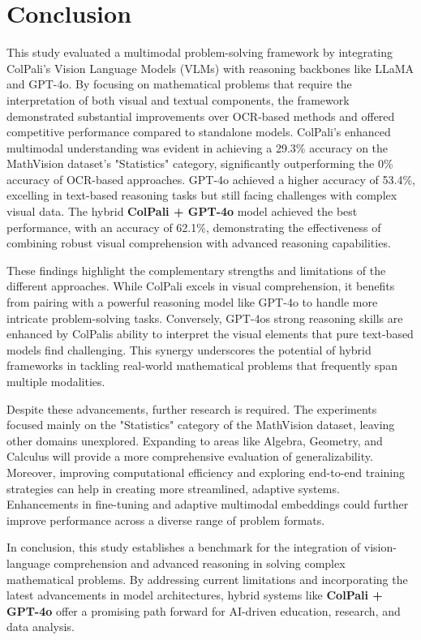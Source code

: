 \documentclass[a4paper,twoside,flushend, 10pt]{article}
\begin{document}
\section{Conclusion}
\noindent
This study evaluated a multimodal problem-solving framework by integrating ColPali's Vision Language Models (VLMs) with reasoning backbones like LLaMA and GPT-4o. By focusing on mathematical problems that require the interpretation of both visual and textual components, the framework demonstrated substantial improvements over OCR-based methods and offered competitive performance compared to standalone models. ColPali's enhanced multimodal understanding was evident in achieving a 29.3\% accuracy on the MathVision dataset's "Statistics" category, significantly outperforming the 0\% accuracy of OCR-based approaches\cite{WPS2024}. GPT-4o achieved a higher accuracy of 53.4\%, excelling in text-based reasoning tasks but still facing challenges with complex visual data. The hybrid \textbf{ColPali + GPT-4o} model achieved the best performance, with an accuracy of 62.1\%, demonstrating the effectiveness of combining robust visual comprehension with advanced reasoning capabilities\cite{FSW2024}. 

These findings highlight the complementary strengths and limitations of the different approaches. While ColPali excels in visual comprehension, it benefits from pairing with a powerful reasoning model like GPT-4o to handle more intricate problem-solving tasks. Conversely, GPT-4o\textquotesingle s strong reasoning skills are enhanced by ColPali\textquotesingle s ability to interpret the visual elements that pure text-based models find challenging. This synergy underscores the potential of hybrid frameworks in tackling real-world mathematical problems that frequently span multiple modalities.

Despite these advancements, further research is required. The experiments focused mainly on the "Statistics" category of the MathVision dataset, leaving other domains unexplored. Expanding to areas like Algebra, Geometry, and Calculus will provide a more comprehensive evaluation of generalizability. Moreover, improving computational efficiency and exploring end-to-end training strategies can help in creating more streamlined, adaptive systems. Enhancements in fine-tuning and adaptive multimodal embeddings could further improve performance across a diverse range of problem formats.

In conclusion, this study establishes a benchmark for the integration of vision-language comprehension and advanced reasoning in solving complex mathematical problems. By addressing current limitations and incorporating the latest advancements in model architectures, hybrid systems like \textbf{ColPali + GPT-4o} offer a promising path forward 
for AI-driven education, research, and data analysis.
\end{document}
